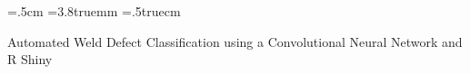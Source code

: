 \documentclass{article_saj}
\begin{document}
%
\parindent=.5cm
\baselineskip=3.8truemm
\columnsep=.5truecm
%
\newenvironment{lefteqnarray}{\arraycolsep=0pt\begin{eqnarray}}
{\end{eqnarray}\protect\aftergroup\ignorespaces}
\newenvironment{lefteqnarray*}{\arraycolsep=0pt\begin{eqnarray*}}
{\end{eqnarray*}\protect\aftergroup\ignorespaces}
\newenvironment{leftsubeqnarray}{\arraycolsep=0pt\begin{subeqnarray}}
{\end{subeqnarray}\protect\aftergroup\ignorespaces}
%


{\eightrm Automated Weld Defect Classification using a
Convolutional Neural Network and R Shiny}
\end{document}
